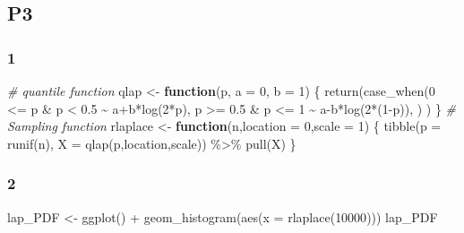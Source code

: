 \documentclass[
]{article}
\newenvironment{Shaded}{\begin{snugshade}}{\end{snugshade}}
\newcommand{\AttributeTok}[1]{\textcolor[rgb]{0.77,0.63,0.00}{#1}}
\newcommand{\CommentTok}[1]{\textcolor[rgb]{0.56,0.35,0.01}{\textit{#1}}}
\newcommand{\ControlFlowTok}[1]{\textcolor[rgb]{0.13,0.29,0.53}{\textbf{#1}}}
\newcommand{\DecValTok}[1]{\textcolor[rgb]{0.00,0.00,0.81}{#1}}
\newcommand{\FloatTok}[1]{\textcolor[rgb]{0.00,0.00,0.81}{#1}}
\newcommand{\FunctionTok}[1]{\textcolor[rgb]{0.00,0.00,0.00}{#1}}
\newcommand{\NormalTok}[1]{#1}
\newcommand{\OtherTok}[1]{\textcolor[rgb]{0.56,0.35,0.01}{#1}}
\newcommand{\SpecialCharTok}[1]{\textcolor[rgb]{0.00,0.00,0.00}{#1}}
\begin{document}
\hypertarget{p3}{%
\subsection{P3}\label{p3}}

\hypertarget{section-3}{%
\subsubsection{1}\label{section-3}}

\begin{Shaded}
\begin{Highlighting}[]
\CommentTok{\# quantile function}
\NormalTok{qlap }\OtherTok{\textless{}{-}} \ControlFlowTok{function}\NormalTok{(p, }\AttributeTok{a =} \DecValTok{0}\NormalTok{, }\AttributeTok{b =} \DecValTok{1}\NormalTok{) \{}
  \FunctionTok{return}\NormalTok{(}\FunctionTok{case\_when}\NormalTok{(}\DecValTok{0} \SpecialCharTok{\textless{}=}\NormalTok{ p }\SpecialCharTok{\&}\NormalTok{ p }\SpecialCharTok{\textless{}} \FloatTok{0.5} \SpecialCharTok{\textasciitilde{}}\NormalTok{ a}\SpecialCharTok{+}\NormalTok{b}\SpecialCharTok{*}\FunctionTok{log}\NormalTok{(}\DecValTok{2}\SpecialCharTok{*}\NormalTok{p),}
\NormalTok{            p }\SpecialCharTok{\textgreater{}=} \FloatTok{0.5} \SpecialCharTok{\&}\NormalTok{ p }\SpecialCharTok{\textless{}=} \DecValTok{1} \SpecialCharTok{\textasciitilde{}}\NormalTok{ a}\SpecialCharTok{{-}}\NormalTok{b}\SpecialCharTok{*}\FunctionTok{log}\NormalTok{(}\DecValTok{2}\SpecialCharTok{*}\NormalTok{(}\DecValTok{1}\SpecialCharTok{{-}}\NormalTok{p)),}
\NormalTok{        )}
\NormalTok{  )}
\NormalTok{\}}
\CommentTok{\# Sampling function}
\NormalTok{rlaplace }\OtherTok{\textless{}{-}} \ControlFlowTok{function}\NormalTok{(n,}\AttributeTok{location =} \DecValTok{0}\NormalTok{,}\AttributeTok{scale =} \DecValTok{1}\NormalTok{) \{}
  \FunctionTok{tibble}\NormalTok{(}\AttributeTok{p =} \FunctionTok{runif}\NormalTok{(n),}
         \AttributeTok{X =} \FunctionTok{qlap}\NormalTok{(p,location,scale)) }\SpecialCharTok{\%\textgreater{}\%} 
    \FunctionTok{pull}\NormalTok{(X)}
\NormalTok{\}}
\end{Highlighting}
\end{Shaded}

\hypertarget{section-4}{%
\subsubsection{2}\label{section-4}}

\begin{Shaded}
\begin{Highlighting}[]
\NormalTok{lap\_PDF }\OtherTok{\textless{}{-}} \FunctionTok{ggplot}\NormalTok{() }\SpecialCharTok{+}
  \FunctionTok{geom\_histogram}\NormalTok{(}\FunctionTok{aes}\NormalTok{(}\AttributeTok{x =} \FunctionTok{rlaplace}\NormalTok{(}\DecValTok{10000}\NormalTok{)))}
\NormalTok{lap\_PDF}
\end{Highlighting}
\end{Shaded}
\end{document}
